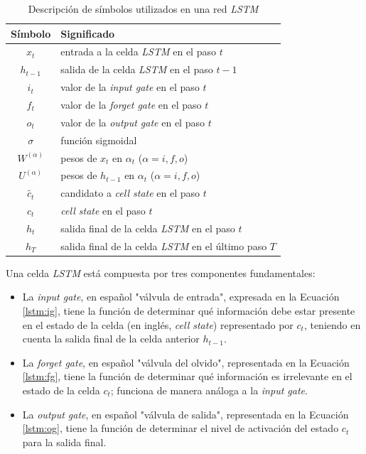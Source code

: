 \begin{table}[!tb]
  \center \caption{Descripción de símbolos utilizados en una red \textit{LSTM}}
    \begin{center}
      \begin{tabular}{|c|l|}
        \hline
        \textbf{Símbolo} & \textbf{Significado}\\
        \hline
        $x_{t}$ & entrada a la celda \textit{LSTM} en el paso $t$ \\
        $h_{t-1}$ & salida de la celda \textit{LSTM} en el paso $t-1$ \\
        $i_{t}$ & valor de la \textit{input gate} en el paso $t$\\
        $f_{t}$	& valor de la \textit{forget gate} en el paso $t$ \\
        $o_{t}$	& valor de la \textit{output gate} en el paso $t$\\
        $\sigma$ & función sigmoidal\\
        $W^{(\alpha)}$ & pesos de $x_{t}$ en $\alpha_t$ ($\alpha = {i, f, o}$) \\
        $U^{(\alpha)}$ & pesos de $h_{t-1}$ en $\alpha_t$ ($\alpha = {i, f, o}$) \\
        $\tilde{c_{t}}$ & candidato a \textit{cell state} en el paso $t$\\
        $c_{t}$ & \textit{cell state} en el paso $t$ \\
        $h_{t}$ & salida final de la celda \textit{LSTM} en el paso $t$ \\
        $h_{T}$ & salida final de la celda \textit{LSTM} en el último paso $T$ \\
        \hline
        \end{tabular}
    \end{center}
    \label{tab:cell_state}
\end{table}

Una celda \textit{LSTM} está compuesta por tres componentes fundamentales:
\begin{itemize}
  \item La \textit{input gate}, en español "válvula de entrada", expresada en la Ecuación \ref{lstm:ig}, tiene la función de determinar qué información debe estar presente en el estado de la celda (en inglés, \textit{cell state}) representado por $c_{t}$, teniendo en cuenta la salida final de la celda anterior $h_{t-1}$.
  \item La \textit{forget gate}, en español "válvula del olvido", representada en la Ecuación \ref{lstm:fg}, tiene la función de determinar qué información es irrelevante en el estado de la celda $c_{t}$; funciona de manera análoga a la \textit{input gate}.
  \item La \textit{output gate}, en español "válvula de salida", representada en la Ecuación \ref{lstm:og}, tiene la función de determinar el nivel de activación del estado $c_{t}$ para la salida final.
\end{itemize}

